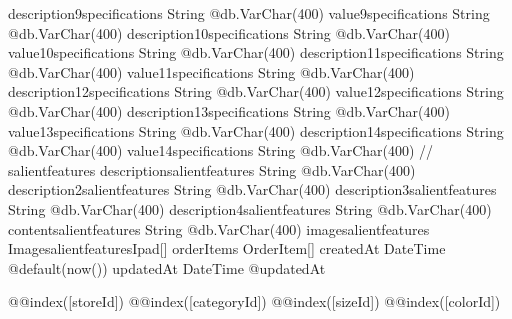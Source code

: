 {  description9specifications  String                     @db.VarChar(400)
  value9specifications        String                     @db.VarChar(400)
  description10specifications String                     @db.VarChar(400)
  value10specifications       String                     @db.VarChar(400)
  description11specifications String                     @db.VarChar(400)
  value11specifications       String                     @db.VarChar(400)
  description12specifications String                     @db.VarChar(400)
  value12specifications       String                     @db.VarChar(400)
  description13specifications String                     @db.VarChar(400)
  value13specifications       String                     @db.VarChar(400)
  description14specifications String                     @db.VarChar(400)
  value14specifications       String                     @db.VarChar(400)
  // salientfeatures
  descriptionsalientfeatures  String                     @db.VarChar(400)
  description2salientfeatures String                     @db.VarChar(400)
  description3salientfeatures String                     @db.VarChar(400)
  description4salientfeatures String                     @db.VarChar(400)
  contentsalientfeatures      String                     @db.VarChar(400)
  imagesalientfeatures    ImagesalientfeaturesIpad[]
  orderItems                  OrderItem[]
  createdAt                   DateTime                   @default(now())
  updatedAt                   DateTime                   @updatedAt

  @@index([storeId])
  @@index([categoryId])
  @@index([sizeId])
  @@index([colorId])
}

